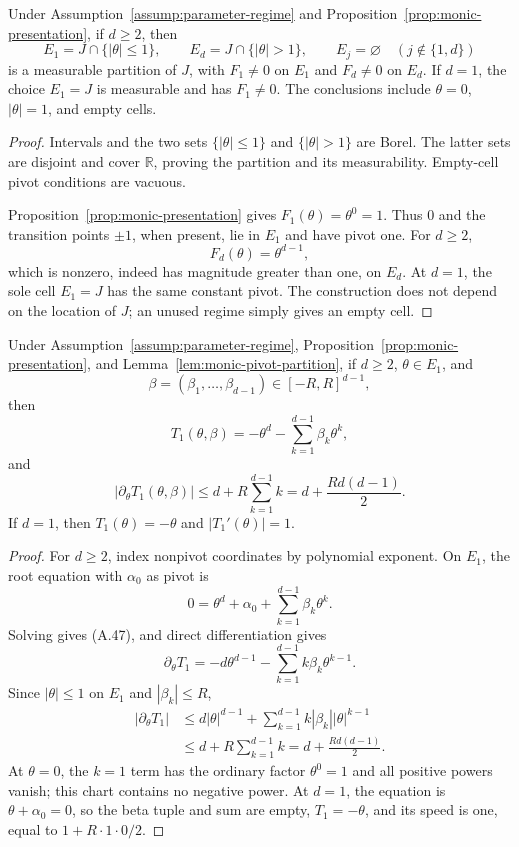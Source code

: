 \begin{lemma}
\label{lem:monic-pivot-partition}
Under Assumption~\ref{assump:parameter-regime} and
Proposition~\ref{prop:monic-presentation}, if $d\geq2$, then
\[
E_1=J\cap\{|\theta|\leq1\},
\qquad
E_d=J\cap\{|\theta|>1\},
\qquad
E_j=\varnothing\quad(j\notin\{1,d\})
\tag{A.46}
\]
is a measurable partition of $J$, with $F_1\neq0$ on $E_1$ and
$F_d\neq0$ on $E_d$.  If $d=1$, the choice $E_1=J$ is measurable and has
$F_1\neq0$.  The conclusions include $\theta=0$, $|\theta|=1$, and empty
cells.
\end{lemma}

\begin{proof}
Intervals and the two sets $\{|\theta|\leq1\}$ and
$\{|\theta|>1\}$ are Borel.  The latter sets are disjoint and cover
$\mathbb R$, proving the partition and its measurability.  Empty-cell pivot
conditions are vacuous.

Proposition~\ref{prop:monic-presentation} gives
$F_1(\theta)=\theta^0=1$.  Thus $0$ and the transition points $\pm1$, when
present, lie in $E_1$ and have pivot one.  For $d\geq2$,
\[
F_d(\theta)=\theta^{d-1},
\]
which is nonzero, indeed has magnitude greater than one, on $E_d$.  At
$d=1$, the sole cell $E_1=J$ has the same constant pivot.  The construction
does not depend on the location of $J$; an unused regime simply gives an
empty cell.
\end{proof}

\begin{lemma}
\label{lem:monic-low-chart}
Under Assumption~\ref{assump:parameter-regime},
Proposition~\ref{prop:monic-presentation}, and
Lemma~\ref{lem:monic-pivot-partition}, if $d\geq2$,
$\theta\in E_1$, and
\[
\beta=(\beta_1,\ldots,\beta_{d-1})\in[-R,R]^{d-1},
\]
then
\[
T_1(\theta,\beta)
=-\theta^d-\sum_{k=1}^{d-1}\beta_k\theta^k,
\tag{A.47}
\]
and
\[
|\partial_\theta T_1(\theta,\beta)|
\leq d+R\sum_{k=1}^{d-1}k
=d+\frac{Rd(d-1)}2.
\tag{A.48}
\]
If $d=1$, then $T_1(\theta)=-\theta$ and
$|T_1'(\theta)|=1$.
\end{lemma}

\begin{proof}
For $d\geq2$, index nonpivot coordinates by polynomial exponent.  On $E_1$,
the root equation with $\alpha_0$ as pivot is
\[
0=\theta^d+\alpha_0+\sum_{k=1}^{d-1}\beta_k\theta^k.
\]
Solving gives (A.47), and direct differentiation gives
\[
\partial_\theta T_1
=-d\theta^{d-1}-\sum_{k=1}^{d-1}k\beta_k\theta^{k-1}.
\]
Since $|\theta|\leq1$ on $E_1$ and $|\beta_k|\leq R$,
\[
\begin{aligned}
|\partial_\theta T_1|
&\leq d|\theta|^{d-1}
 +\sum_{k=1}^{d-1}k|\beta_k||\theta|^{k-1}\\
&\leq d+R\sum_{k=1}^{d-1}k
=d+\frac{Rd(d-1)}2.
\end{aligned}
\]
At $\theta=0$, the $k=1$ term has the ordinary factor
$\theta^0=1$ and all positive powers vanish; this chart contains no negative
power.  At $d=1$, the equation is $\theta+\alpha_0=0$, so the beta tuple and
sum are empty, $T_1=-\theta$, and its speed is one, equal to
$1+R\cdot1\cdot0/2$.
\end{proof}

